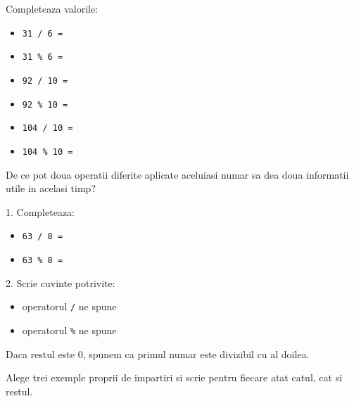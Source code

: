 \begin{guidebox}
  Completeaza valorile:
  \begin{itemize}
    \item \texttt{31 / 6 =} \hrulefill
    \item \texttt{31 \% 6 =} \hrulefill
    \item \texttt{92 / 10 =} \hrulefill
    \item \texttt{92 \% 10 =} \hrulefill
    \item \texttt{104 / 10 =} \hrulefill
    \item \texttt{104 \% 10 =} \hrulefill
  \end{itemize}
\end{guidebox}

\begin{guidebox}
  De ce pot doua operatii diferite aplicate aceluiasi numar sa dea doua informatii utile in acelasi timp?
\end{guidebox}

\newpage
{}

\begin{solobox}
  1. Completeaza:
  \begin{itemize}
    \item \texttt{63 / 8 =} \hrulefill
    \item \texttt{63 \% 8 =} \hrulefill
  \end{itemize}

  2. Scrie cuvinte potrivite:
  \begin{itemize}
    \item operatorul \texttt{/} ne spune \hrulefill
    \item operatorul \texttt{\%} ne spune \hrulefill
  \end{itemize}
\end{solobox}

\begin{guidebox}[Observatie]
  Daca restul este 0, spunem ca primul numar este divizibil cu al doilea.
\end{guidebox}

\begin{solobox}
  Alege trei exemple proprii de impartiri si scrie pentru fiecare atat catul, cat si restul.
\end{solobox}

\newpage
{}

